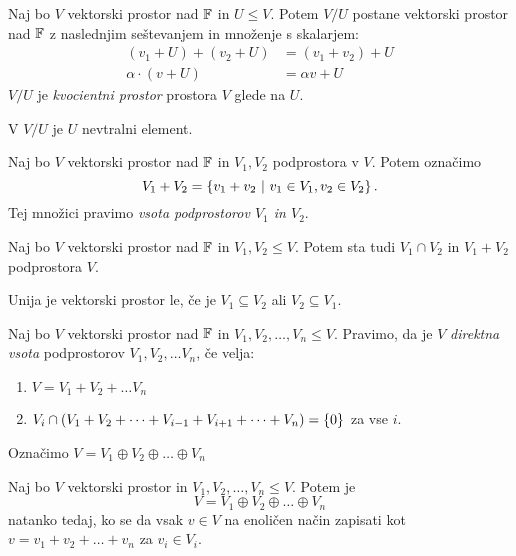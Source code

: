 \documentclass[12pt, a4paper]{article}
\begin{document}
\begin{izrek}
Naj bo $V$ vektorski prostor nad $\mathbb{F}$ in $U\leq V$. Potem $V/U$ postane vektorski prostor nad $\mathbb{F}$ z naslednjim seštevanjem in množenje s skalarjem:
\begin{align*}
(v_1+U)+(v_2+U)&=(v_1+v_2)+U
\\
\alpha\cdot(v+U)&=\alpha v+U
\end{align*}
$V/U$ je \emph{kvocientni prostor} prostora $V$ glede na $U$.
\end{izrek}

\obvs

\begin{opomba}
V $V/U$ je $U$ nevtralni element.
\end{opomba}

\begin{definicija}
Naj bo $V$ vektorski prostor nad $\mathbb{F}$ in $V_1,V_2$ podprostora v $V$. Potem označimo
\[
V_1+V_2=\left\{v_1+v_2~\middle\vert~v_1\in V_1,v_2\in V_2\right\}.
\]
Tej množici pravimo \emph{vsota podprostorov $V_1$ in $V_2$}.
\end{definicija}

\begin{trditev}
Naj bo $V$ vektorski prostor nad $\mathbb{F}$ in $V_1,V_2\leq V$. Potem sta tudi $V_1\cap V_2$ in $V_1+V_2$ podprostora $V$.
\end{trditev}

\obvs

\begin{opomba}
Unija je vektorski prostor le, če je $V_1\subseteq V_2$ ali $V_2\subseteq V_1$.
\end{opomba}

\begin{definicija}
Naj bo $V$ vektorski prostor nad $\mathbb{F}$ in $V_1,V_2,\dots, V_n\leq V$. Pravimo, da je $V$ \emph{direktna vsota} podprostorov $V_1,V_2,\dots V_n$, če velja:

\begin{enumerate}[label=\roman*)]
\item $V=V_1+V_2+\dots V_n$
\item $V_i\cap (V_1+V_2+\dots+V_{i-1}+V_{i+1}+\dots+V_n)=\left\{0\right\}$ za vse $i$.
\end{enumerate}

Označimo $V=V_1\oplus V_2\oplus\dots\oplus V_n$
\end{definicija}

\begin{izrek}
Naj bo $V$ vektorski prostor in $V_1,V_2,\dots, V_n\leq V$. Potem je
\[
V=V_1\oplus V_2\oplus\dots\oplus V_n
\]
natanko tedaj, ko se da vsak $v\in V$ na enoličen način zapisati kot $v=v_1+v_2+\dots+v_n$ za $v_i\in V_i$.
\end{izrek}
\end{document}
